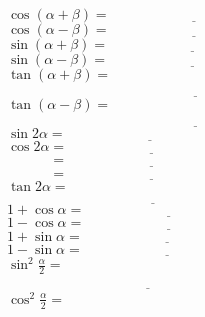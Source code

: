 \documentclass[headheight=4.5cm,
			   margin=2cm,
			   titlewidth=0.6,
			   sansserif,
			   firstcolor=color1,
			   secondcolor=color2,
			   logo=myLogo.png,
			  ]{TelecomNancy}
\begin{document}
	\newpage
	
	\nextExercise[和角差角 正弦、余弦、正切 公式]{}
			$\cos(\alpha+\beta)=\underline{\hspace{5cm}}$\\
			$\cos(\alpha-\beta)=\underline{\hspace{5cm}}$\\
			$\sin(\alpha+\beta)=\underline{\hspace{5cm}}$\\
			$\sin(\alpha-\beta)=\underline{\hspace{5cm}}$\\
			$\tan(\alpha+\beta)=$\\
			$\phantom{\tan(\alpha+\beta)=}\underline{\hspace{5cm}}$\\
			$\tan(\alpha-\beta)=$\\
			$\phantom{\tan(\alpha+\beta)=}\underline{\hspace{5cm}}$\\
			$\sin2\alpha=\underline{\hspace{5cm}}$\\
			$\cos2\alpha=\underline{\hspace{5cm}}$\\
			$\phantom{\cos2\alpha}=\underline{\hspace{5cm}}$\\
			$\phantom{\cos2\alpha}=\underline{\hspace{5cm}}$\\
			$\tan2\alpha=$\\
			$\phantom{\tan2\alpha=}\underline{\hspace{5cm}}$\\
			$1+\cos\alpha=\underline{\hspace{5cm}}$\\
			$1-\cos\alpha=\underline{\hspace{5cm}}$\\
			$1+\sin\alpha=\underline{\hspace{5cm}}$\\
			$1-\sin\alpha=\underline{\hspace{5cm}}$\\
			$\sin^2\frac{\alpha}{2}=$\\
			$\phantom{\sin^2\frac{\alpha}{2}=}\underline{\hspace{5cm}}$\\
			$\cos^2\frac{\alpha}{2}=$\\
\end{document}
